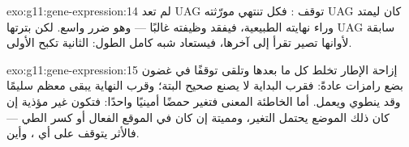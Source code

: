 \begin{solution}{exo:g11:gene-expression:14}
لم تعد UAG توقف : فكل  تنتهي مورّثته  UAG كان ليمتد
وراء نهايته الطبيعية، فيفقد وظيفته غالبًا --- وهو ضرر واسع. لكن
 بترتها UAG سابقة لأوانها تصير تقرأ إلى آخرها، فيستعاد 
شبه كامل الطول:  الثانية تكبح الأولى.
\end{solution}

\begin{solution}{exo:g11:gene-expression:15}
إزاحة الإطار تخلط كل ما بعدها وتلقى توقفًا في غضون بضع رامزات عادةً:
فقرب البداية لا يصنع  صحيح البتة؛ وقرب النهاية يبقى معظم
 سليمًا وقد ينطوي ويعمل. أما الخاطئة المعنى فتغير حمضًا
أمينيًا واحدًا: فتكون غير مؤذية إن كان ذلك الموضع يحتمل التغير، ومميتة
إن كان في الموقع الفعال أو كسر الطي --- فالأثر يتوقف على أي ،
وأين.
\end{solution}

